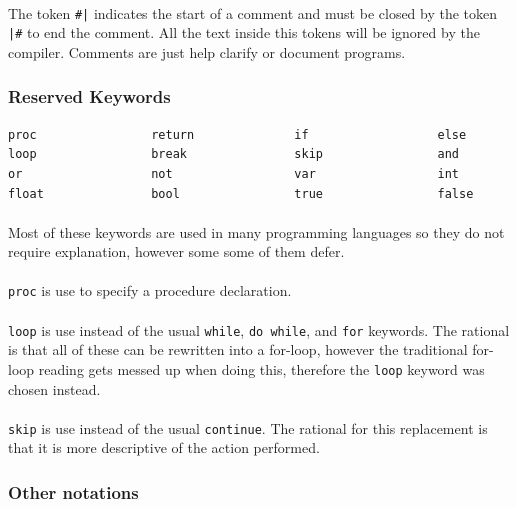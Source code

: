 \documentclass[12pt, titlepage]{article}
\begin{document}
\paragraph{} The token \texttt{\#|} indicates the start of a comment and
must be closed by the token \texttt{|\#} to end the comment. All the text
inside this tokens will be ignored by the compiler. Comments are just help
clarify or document programs.

\subsubsection{Reserved Keywords}
\begin{verbatim}
proc                return              if                  else
loop                break               skip                and
or                  not                 var                 int
float               bool                true                false
\end{verbatim}

\paragraph{} Most of these keywords are used in many programming languages so
they do not require explanation, however some some of them defer.

\paragraph{} \texttt{proc} is use to specify a procedure declaration. 

\paragraph{} \texttt{loop} is use instead of the usual \texttt{while},
\texttt{do while}, and \texttt{for} keywords. The rational is that all of these
can be rewritten into a for-loop, however the traditional for-loop reading
gets messed up when doing this, therefore the \texttt{loop} keyword was chosen
instead.

\paragraph{} \texttt{skip} is use instead of the usual \texttt{continue}. The
rational for this replacement is that it is more descriptive of the action
performed.

\subsubsection{Other notations}
\end{document}
